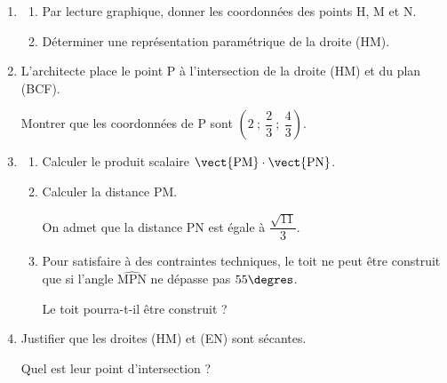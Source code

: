 \begin{enumerate}
\item 
	\begin{enumerate}
		\item Par lecture graphique, donner les coordonnées des points H, M et N.
		\item Déterminer une représentation paramétrique de la droite (HM).
	\end{enumerate}
\item L'architecte place le point P à l'intersection de la droite (HM) et du plan (BCF).

Montrer que les coordonnées de P sont $\left(2~;~\dfrac23~;~\dfrac43\right)$.
\item
	\begin{enumerate}
		\item Calculer le produit scalaire $\vect{\text{PM}} \cdot \vect{\text{PN}}$.
		\item Calculer la distance PM.
		
On admet que la distance PN est égale à $\dfrac{\sqrt{11}}{3}$.
		\item Pour satisfaire à des contraintes techniques, le toit ne peut être construit que si l'angle $\widehat{\text{MPN}}$ ne dépasse pas $55\degres$.
		
Le toit pourra-t-il être construit ?
	\end{enumerate}
\item Justifier que les droites (HM) et (EN) sont sécantes.

Quel est leur point d'intersection ?
\end{enumerate}

\bigskip
